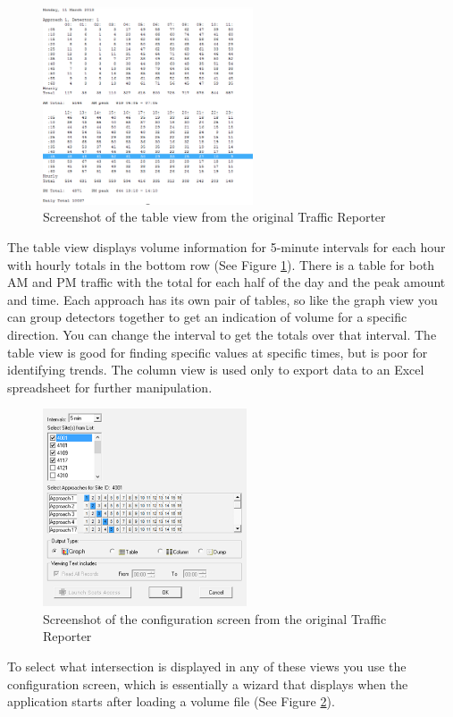 \documentclass{article}
\begin{document}
\begin{figure}[!b]
\centerline{\includegraphics[height=2.3in]{oldTable}}
\caption{Screenshot of the table view from the original Traffic Reporter}
\label{fig:oldTable}
\end{figure}

The table view displays volume information for 5-minute
intervals for each hour with hourly totals in the bottom row
(See Figure \ref{fig:oldTable}). There is a table for both AM and PM traffic with
the total for each half of the day and the peak amount and
time. Each approach has its own pair of tables, so like the
graph view you can group detectors together to get an
indication of volume for a specific direction. You can change
the interval to get the totals over that interval.
The table view is good for finding specific values at
specific times, but is poor for identifying trends.
The column view is used only to export data to an Excel
spreadsheet for further manipulation.

\begin{figure}[!t]
\centerline{\includegraphics[height=2.3in]{oldConfig}}
\caption{Screenshot of the configuration screen from the original Traffic Reporter}
\label{fig:oldConfig}
\end{figure}


To select what intersection is displayed in any of these views you use the configuration screen, which is essentially a wizard that displays when the application starts after loading a volume file (See Figure \ref{fig:oldConfig}).
\end{document}
